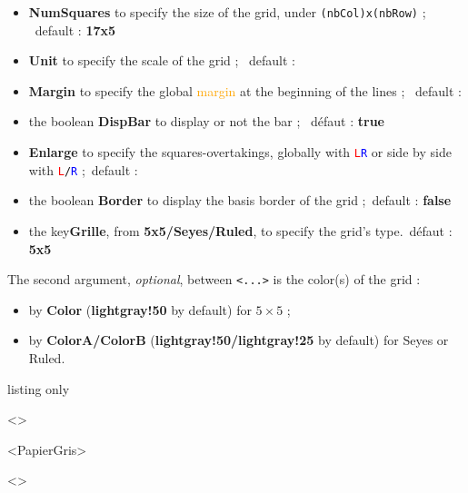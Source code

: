 \documentclass[a4paper]{article}
\newcommand\Cle[1]{{\bfseries\sffamily\textlangle #1\textrangle}}
\begin{document}
\begin{itemize}
	\item \Cle{NumSquares} to specify the size of the grid, under \texttt{(nbCol)x(nbRow)} ; \hfill~default : \Cle{17x5}
	\item \Cle{Unit} to specify the scale of the grid ; \hfill~default : \Cle{1}
	\item \Cle{Margin} to specify the global \textcolor{orange}{margin} at the beginning of the lines ; \hfill~default : \Cle{0}
	\item the boolean \Cle{DispBar} to display or not the bar ; \hfill~défaut : \Cle{true}
	\item \Cle{Enlarge} to specify the squares-overtakings, globally with \texttt{\textcolor{red}{L}\textcolor{blue}{R}} or side by side with \texttt{\textcolor{red}{L}/\textcolor{blue}{R}} ;\hfill~default : \Cle{0}
	\item the boolean \Cle{Border} to display the basis border of the grid ;\hfill~default : \Cle{false}
	\item the key\Cle{Grille}, from \Cle{5x5/Seyes/Ruled}, to specify the grid's type.\hfill~défaut : \Cle{5x5}
\end{itemize}

The second argument, \textit{optional}, between \texttt{<...>} is the color(s) of the grid :

\begin{itemize}
	\item by \Cle{Color} (\Cle{lightgray!50} by default) for $5\times5$  ;
	\item by \Cle{ColorA/ColorB} (\Cle{lightgray!50/lightgray!25} by default) for Seyes or Ruled.
\end{itemize}

\medskip

\begin{PresentationCode}{listing only}
\begin{EnvGrid}[NumSquares=18x4,Grid=Seyes,Margin=3]<\ColSeyes>
\end{EnvGrid}

\begin{EnvGrid}[NumSquares=36x8,Enlarge=3/3]<PapierGris>
\end{EnvGrid}

\begin{center}
	\begin{EnvGrid}[NumSquares=12x3,Grid=Ruled,Margin=2]<\ColRuled>
	\end{EnvGrid}
\end{center}
\end{PresentationCode}
\end{document}
